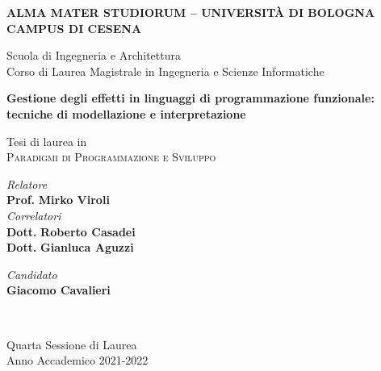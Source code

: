 \begin{titlepage}
	\begin{center}
		\large
		\textbf{ALMA MATER STUDIORUM -- UNIVERSITÀ DI BOLOGNA \\ CAMPUS DI CESENA}
		\\
		\noindent\hrulefill
		\vspace{0.4cm}

		\Large
		Scuola di Ingegneria e Architettura \\
		Corso di Laurea Magistrale in Ingegneria e Scienze Informatiche

		\Huge
		\vspace{4cm}
		\textbf{Gestione degli effetti in linguaggi di programmazione funzionale: tecniche di modellazione e interpretazione}

		\large
		\vspace{1cm}
		Tesi di laurea in
		\\
		\textsc{Paradigmi di Programmazione e Sviluppo}

		\vspace{5.5cm}
		\begin{minipage}[t]{0.64\textwidth}
			\begin{flushleft}
				\textit{Relatore}
				\\
				\textbf{Prof.} \textbf{Mirko Viroli}
				\\
				\vspace{0.4cm}
				\textit{Correlatori}
				\\
				\textbf{Dott.} \textbf{Roberto Casadei}
				\\
				\textbf{Dott.} \textbf{Gianluca Aguzzi}
			\end{flushleft}
		\end{minipage}
		\begin{minipage}[t]{0.34\textwidth}
			\begin{flushright}
				\textit{Candidato}
				\\
				\textbf{Giacomo Cavalieri}
			\end{flushright}
		\end{minipage}\\

		\vfill
		\noindent\hrulefill
		\vspace{0.3cm}
		\Large

		Quarta Sessione di Laurea
		\\
		Anno Accademico 2021-2022
	\end{center}
\end{titlepage}
\restoregeometry